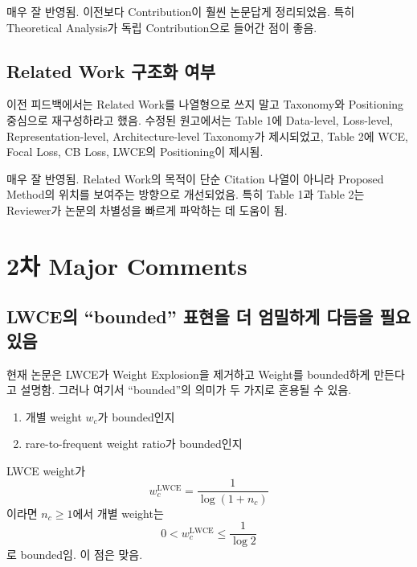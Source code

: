 \documentclass[11pt,a4paper]{article}
\begin{document}
\begin{tcolorbox}[title=반영 평가]
매우 잘 반영됨. 이전보다 Contribution이 훨씬 논문답게 정리되었음. 특히 Theoretical Analysis가 독립 Contribution으로 들어간 점이 좋음.
\end{tcolorbox}

\subsection{Related Work 구조화 여부}

이전 피드백에서는 Related Work를 나열형으로 쓰지 말고 Taxonomy와 Positioning 중심으로 재구성하라고 했음. 수정된 원고에서는 Table 1에 Data-level, Loss-level, Representation-level, Architecture-level Taxonomy가 제시되었고, Table 2에 WCE, Focal Loss, CB Loss, LWCE의 Positioning이 제시됨.

\begin{tcolorbox}[title=반영 평가]
매우 잘 반영됨. Related Work의 목적이 단순 Citation 나열이 아니라 Proposed Method의 위치를 보여주는 방향으로 개선되었음. 특히 Table 1과 Table 2는 Reviewer가 논문의 차별성을 빠르게 파악하는 데 도움이 됨.
\end{tcolorbox}

\section{2차 Major Comments}

\subsection{LWCE의 ``bounded'' 표현을 더 엄밀하게 다듬을 필요 있음}

현재 논문은 LWCE가 Weight Explosion을 제거하고 Weight를 bounded하게 만든다고 설명함. 그러나 여기서 ``bounded''의 의미가 두 가지로 혼용될 수 있음.

\begin{enumerate}
\item 개별 weight \(w_c\)가 bounded인지
\item rare-to-frequent weight ratio가 bounded인지
\end{enumerate}

LWCE weight가
\begin{equation}
w_c^{\mathrm{LWCE}} = \frac{1}{\log(1+n_c)}
\end{equation}
이라면 \(n_c\geq 1\)에서 개별 weight는
\begin{equation}
0 < w_c^{\mathrm{LWCE}} \leq \frac{1}{\log 2}
\end{equation}
로 bounded임. 이 점은 맞음.
\end{document}
